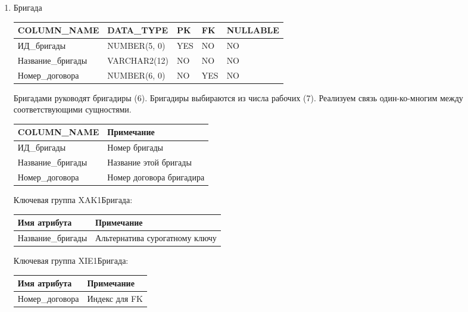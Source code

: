 \begin{enumerate}
\begin{tabular}{|p{4cm}|p{5cm}|}
    \end{tabular}

    \item{Бригада}

    \begin{tabular}{|p{4cm}|p{3cm}|p{1cm}|p{1cm}|p{2cm}|} \hline

        {\bf COLUMN\_NAME} & {\bf DATA\_TYPE} & {\bf PK} & {\bf FK} & {\bf NULLABLE} \\ \hline
        ИД\_бригады & NUMBER(5, 0) & YES & NO & NO \\ \hline
        Название\_бригады & VARCHAR2(12) & NO & NO & NO \\ \hline
        Номер\_договора & NUMBER(6, 0) & NO & YES & NO \\ \hline

    \end{tabular}

    Бригадами руководят бригадиры (6).
    Бригадиры выбираются из числа рабочих (7).
    Реализуем связь один-ко-многим между соответствующими сущностями.

    \begin{tabular}{|p{4cm}|p{5cm}|} \hline

        {\bf COLUMN\_NAME} & {\bf Примечание} \\ \hline
        ИД\_бригады & Номер бригады \\ \hline
        Название\_бригады & Название этой бригады \\ \hline
        Номер\_договора & Номер договора бригадира \\ \hline

    \end{tabular}

    Ключевая группа XAK1Бригада:

    \begin{tabular}{|p{4cm}|p{5cm}|} \hline

        {\bf Имя атрибута} & {\bf Примечание} \\ \hline
        Название\_бригады & Альтернатива сурогатному ключу \\ \hline

    \end{tabular}

    Ключевая группа XIE1Бригада:

    \begin{tabular}{|p{4cm}|p{5cm}|} \hline

        {\bf Имя атрибута} & {\bf Примечание} \\ \hline
        Номер\_договора & Индекс для FK \\ \hline


\end{tabular}
\end{enumerate}
